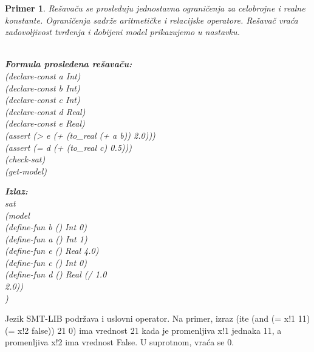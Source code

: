 \documentclass[12pt,oneside]{memoir}
\newcommand\tab[1][0.5cm]{\hspace*{#1}}
\newtheorem{primer}{Primer}
\begin{document}
\begin{primer} \label{example3} 
Rešavaču se prosleđuju jednostavna ograničenja za celobrojne i realne konstante.
Ograničenja sadrže aritmetičke i relacijske operatore. Rešavač vraća zadovoljivost tvrđenja i dobijeni model prikazujemo u nastavku.\\ \\
\begin{minipage}[b]{0.47\textwidth}
\textbf{Formula prosleđena rešavaču:}
\\(declare-const a Int)
\\(declare-const b Int)
\\(declare-const c Int)
\\(declare-const d Real)
\\(declare-const e Real)
\\(assert (> e (+ (to\_real (+ a b)) 2.0)))
\\(assert (= d (+ (to\_real c) 0.5)))
\\(check-sat)
\\(get-model)
\end{minipage}
\hspace{1.6cm}
\begin{minipage}[t]{0.4\textwidth}
\vspace{-6cm}
\textbf{Izlaz:}
\\sat 
\\(model
\\\tab(define-fun b () Int 0) 
\\\tab(define-fun a () Int 1) 
\\\tab(define-fun e () Real 4.0) 
\\\tab(define-fun c () Int 0) 
\\\tab(define-fun d () Real (/ 1.0 
\\\tab 2.0))
\\)
\end{minipage}

\end{primer}

Jezik SMT-LIB podržava i uslovni operator. Na primer,
izraz (ite (and (= x!1 11) (= x!2 false)) 21 0) ima vrednost 21 kada je promenljiva x!1 jednaka 11, a promenljiva x!2 ima vrednost False. U suprotnom, vraća se 0.
\end{document}
